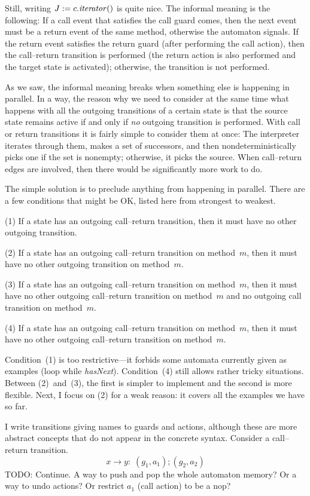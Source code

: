 Still, writing $J:=c.{\it iterator}()$ is quite nice.
The informal meaning is the following:
If a call event that satisfies the call guard comes, then the next event must be a return event of the same method, otherwise the automaton signals.
If the return event satisfies the return guard (after performing the call action), then the call--return transition is performed (the return action is also performed and the target state is activated); otherwise, the transition is not performed.

As we saw, the informal meaning breaks when something else is happening in parallel.
In a way, the reason why we need to consider at the same time what happens with all the outgoing transitions of a certain state is that the source state remains active if and only if {\it no\/} outgoing transition is performed. With call or return transitions it is fairly simple to consider them at once:
The interpreter iterates through them, makes a set of successors, and then nondeterministically picks one if the set is nonempty; otherwise, it picks the source.
When call--return edges are involved, then there would be significantly more work to do.

The simple solution is to preclude anything from happening in parallel.
There are a few conditions that might be OK, listed here from strongest to weakest.
\item{(1)} If a state has an outgoing call--return transition, then it must have no other outgoing transition.
\item{(2)} If a state has an outgoing call--return transition on method~$m$, then it must have no other outgoing transition on method~$m$.
\item{(3)} If a state has an outgoing call--return transition on method~$m$, then it must have no other outgoing call--return transition on method~$m$ and no outgoing call transition on method~$m$.
\item{(4)} If a state has an outgoing call--return transition on method~$m$, then it must have no other outgoing call--return transition on method~$m$.

\noindent Condition~(1) is too restrictive---it forbids some automata currently given as examples (loop while {\it hasNext\/}).
Condition~(4) still allows rather tricky situations.
Between (2)~and~(3), the first is simpler to implement and the second is more flexible.
Next, I focus on (2) for a weak reason: it covers all the examples we have so far.

I write transitions giving names to guards and actions, although these are more abstract concepts that do not appear in the concrete syntax.
Consider a call--return transition.
$$x\to y:\; (g_1,a_1); (g_2,a_2)$$
TODO: Continue. A way to push and pop the whole automaton memory? Or a way to undo actions? Or restrict $a_1$ (call action) to be a nop?


\bye

